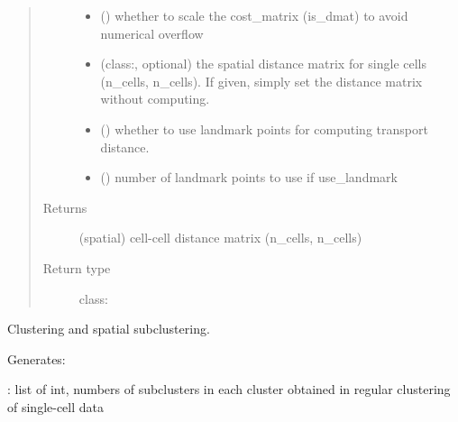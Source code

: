 \documentclass[letterpaper,10pt,english]{sphinxmanual}
\begin{document}
\begin{fulllineitems}
\begin{fulllineitems}
\begin{quote}
\begin{description}
\begin{itemize}
\item {} 
 (\sphinxstyleliteralemphasis{, }) \textendash{} whether to scale the cost\_matrix (is\_dmat) to avoid numerical overflow

\item {} 
 (class:, optional) \textendash{} the spatial distance matrix for single cells (n\_cells, n\_cells). If given, simply set the distance matrix without computing.

\item {} 
 (\sphinxstyleliteralemphasis{, }) \textendash{} whether to use landmark points for computing transport distance.

\item {} 
 (\sphinxstyleliteralemphasis{, }) \textendash{} number of landmark points to use if use\_landmark

\end{itemize}

\item[{Returns}] \leavevmode
(spatial) cell-cell distance matrix (n\_cells, n\_cells)

\item[{Return type}] \leavevmode
class:

\end{description}\end{quote}

\end{fulllineitems}


\begin{fulllineitems}
\label{\detokenize{api:spaotsc.SpaOTsc.spatial_sc.clustering}}
Clustering and spatial subclustering.

Generates:

: list of int, numbers of subclusters in each cluster obtained in regular clustering of single-cell data


\end{fulllineitems}
\end{fulllineitems}
\end{document}
